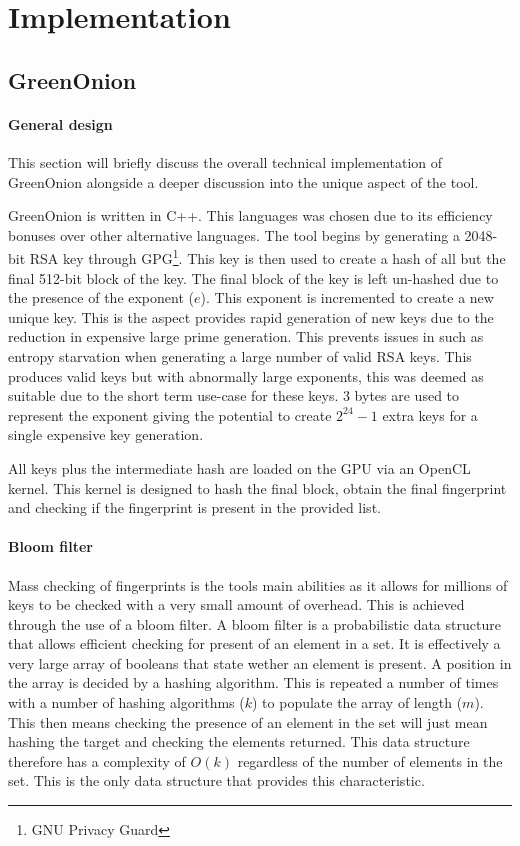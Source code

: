 \chapter{Implementation}
\label{cha:Implementation}


\section{GreenOnion}

\subsubsection{General design}
This section will briefly discuss the overall technical implementation of GreenOnion alongside a deeper discussion into the unique aspect of the tool.


GreenOnion is written in C++. This languages was chosen due to its efficiency bonuses over other alternative languages.
The tool begins by generating a 2048-bit RSA key through GPG\footnote{GNU Privacy Guard}. This key is then used to create a hash of all but the final 512-bit block of the key. The final block of the key is left un-hashed due to the presence of the exponent ($e$). This exponent is incremented to create a new unique key. This is the aspect provides rapid generation of new keys due to the reduction in expensive large prime generation. This prevents issues in such as entropy starvation when generating a large number of valid RSA keys. This produces valid keys but with abnormally large exponents, this was deemed as suitable due to the short term use-case for these keys. 3 bytes are used to represent the exponent giving the potential to create $2^{24} - 1$ extra keys for a single expensive key generation.

All keys plus the intermediate hash are loaded on the GPU via an OpenCL kernel. This kernel is designed to hash the final block, obtain the final fingerprint and checking if the fingerprint is present in the provided list.

\subsubsection{Bloom filter}

Mass checking of fingerprints is the tools main abilities as it allows for millions of keys to be checked with a very small amount of overhead. This is achieved through the use of a bloom filter. A bloom filter is a probabilistic data structure that allows efficient checking for present of an element in a set. It is effectively a very large array of booleans that state wether an element is present. A position in the array is decided by a hashing algorithm. This is repeated a number of times with a number of hashing algorithms ($k$) to populate the array of length ($m$). This then means checking the presence of an element in the set will just mean hashing the target and checking the elements returned. This data structure therefore has a complexity of $O(k)$ regardless of the number of elements in the set. This is the only data structure that provides this characteristic.

